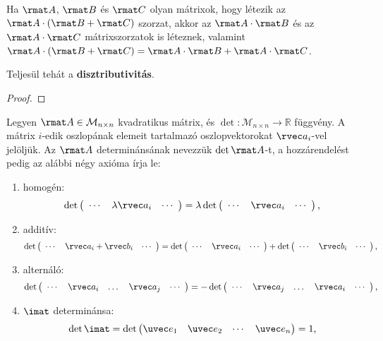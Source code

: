 \begin{statement}
  Ha $\rmat A$, $\rmat B$ és $\rmat C$ olyan mátrixok, hogy létezik az
  $\rmat A \cdot (\rmat B + \rmat C)$ szorzat, akkor az $\rmat A \cdot \rmat B$
  és az $\rmat A \cdot \rmat C$ mátrixszorzatok is léteznek, valamint
  $\rmat A \cdot (\rmat B + \rmat C)
    = \rmat A \cdot \rmat B + \rmat A \cdot \rmat C$.

  Teljesül tehát a \textbf{disztributivitás}.

  \begin{proof}
    \vspace{6em}
  \end{proof}
\end{statement}


\begin{definition}[Determináns]
  \newcommand\noskp{\vspace{-3mm}}
  \newcommand{\edet}[1]{\det \begin{pmatrix} \phantom{i}\cdots & #1 & \cdots\phantom{i} \end{pmatrix}}
  Legyen $\rmat A \in \mathcal M_{n \times n}$ kvadratikus mátrix, és
  $\det: \mathcal M_{n \times n} \rightarrow \mathbb R$ függvény. A mátrix
  $i$-edik oszlopának elemeit tartalmazó oszlopvektorokat $\rvec a_i$-vel
  jelöljük. Az $\rmat A$ determinánsának nevezzük $\det \rmat A$-t, a
  hozzárendelést pedig az alábbi négy axióma írja le:
  \begin{enumerate}
    \item homogén:
          $$
            \edet{\lambda \rvec a_i} = \lambda \edet{\rvec a_i}
            \text,
          $$
    \item \noskp additív:\noskp
          $$
            \edet{\rvec a_i + \rvec b_i} =
            \edet{\rvec a_i} + \edet{\rvec b_i}
            \text,
          $$
    \item \noskp alternáló:\noskp
          $$
            \edet{\rvec a_i & \dots & \rvec a_j} =
            - \edet{\rvec a_j & \dots & \rvec a_i}
            \text,
          $$
    \item \noskp $\imat$ determinánsa:
          $$
            \det \imat =\det \begin{pmatrix}
              \uvec e_1 & \uvec e_2 & \cdots & \uvec e_n
            \end{pmatrix} = 1
            \text,
          $$
  \end{enumerate}
\end{definition}

